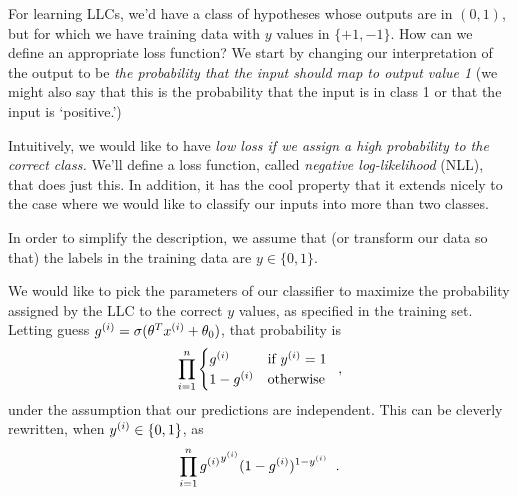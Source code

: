 For learning LLCs, we'd have a class of hypotheses
whose outputs are in $(0, 1)$, but for which we have training data with $y$
values in $\{+1, -1\}$.  How can we define an appropriate loss
function?  We start by changing our interpretation of the output to be
  {\em the probability that the input should map to output value 1} (we
might also say that this is the probability that the input is in class 1 or
that the input is `positive.')

Intuitively, we would like to have
  {\em low loss if we assign a high probability to the correct class.}
We'll define a loss function, called {\em negative log-likelihood} (NLL),
that does just this.  In  addition, it has the cool property that it
extends nicely to the case where we would like to classify our inputs
into more than two classes.

In order to simplify the description, we assume that (or transform our
data so that) the labels
in the training data are $y \in \{0, 1\}$.

We would like to pick the parameters of our classifier to maximize the
probability assigned by the LLC to the correct $y$ values, as
specified in the training set.  Letting guess $g^{(i)} =
  \sigma(\theta^Tx^{(i)} + \theta_0)$,
that probability is
\begin{equation*}
  \prod_{i = 1}^n \begin{cases} g^{(i)} & \text{if $y^{(i)} =
              1$}                               \\ 1 - g^{(i)} & \text{otherwise}
  \end{cases}\;\;,
\end{equation*}
under the assumption that our predictions are independent.  This can
be cleverly rewritten, when $y^{(i)} \in \{0, 1\}$, as
\begin{equation*}
  \prod_{i = 1}^n {g^{(i)}}^{y^{(i)}}(1 - g^{(i)})^{1 - y^{(i)}}\;\;.
\end{equation*}

